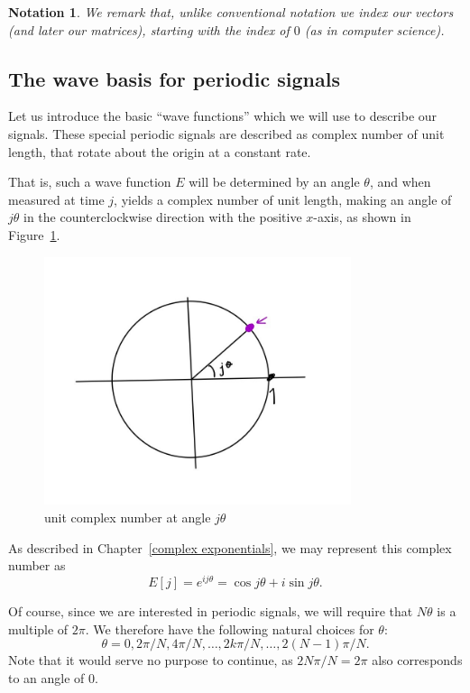 \documentclass[12pt]{report}
\theoremstyle{plain}
\newtheorem{notn}[thm]{Notation}
\begin{document}
\begin{notn}
We remark that, unlike conventional notation we index our vectors (and later our matrices), starting with the index of $0$ (as in computer science).
\end{notn}

\subsection{The wave basis for periodic signals}

Let us introduce the basic ``wave functions'' which we will use to describe our signals. These special periodic signals are described as complex number of unit length, that rotate about the origin at a constant rate.

That is, such a wave function $E$ will be determined by an angle $\theta$, and when measured at time $j$, yields a complex number of unit length, making an angle of $j\theta$ in the counterclockwise direction with the positive $x$-axis, as shown in Figure~\ref{jtheta}.

\begin{figure}[ht!]
\centering
\includegraphics[width=90mm]{jtheta.jpg}
\caption{unit complex number at angle $j \theta$ \label{jtheta}}
\end{figure}

As described in Chapter~\ref{complex exponentials}, we may represent this complex number as
\[E[j] = e^{ij\theta} = \cos{j\theta} + i \sin{j \theta}.\]

Of course, since we are interested in periodic signals, we will require that $N\theta$ is a multiple of $2\pi$. We therefore have the following natural choices for $\theta$:
\[\theta = 0, 2 \pi/N, 4 \pi / N, \ldots, 2k\pi/N, \ldots, 2(N-1)\pi/N.\]
Note that it would serve no purpose to continue, as $2N\pi/N = 2\pi$ also corresponds to an angle of $0$.
\end{document}
